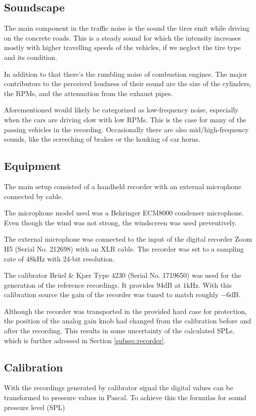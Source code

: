 \documentclass[twocolumn]{article}
\begin{document}
\subsection{Soundscape}
The main component in the traffic noise is the sound the tires emit while driving on the concrete roads.
This is a steady sound for which the intensity increases mostly with higher travelling speeds of the vehicles,
if we neglect the tire type and its condition.

In addition to that there's the rumbling noise of combustion engines.
The major contributors to the perceived loudness of their sound are the size of the cylinders, the RPMs, and
the attenuation from the exhaust pipes.

Aforementioned would likely be categorized as low-frequency noise, especially when the cars are driving slow
with low RPMs.
This is the case for many of the passing vehicles in the recording.
Occasionally there are also mid/high-frequency sounds, like the screeching of brakes or the honking of car horns.

\subsection{Equipment}
The main setup consisted of a handheld recorder with an external microphone connected by cable.

The microphone model used was a Behringer ECM8000 condenser microphone.
Even though the wind was not strong, the windscreen was used preventively.

The external microphone was connected to the input of the digital recorder Zoom H5 (Serial No. 212698) with
an XLR cable.
The recorder was set to a sampling rate of $48\textrm{kHz}$ with 24-bit resolution.

The calibrator Brüel \& Kjær Type 4230 (Serial No. 1719650) was used for the generation of the
reference recordings.
It provides 94dB at $1\textrm{kHz}$.
With this calibration source the gain of the recorder was tuned to match roughly $-6\textrm{dB}$.

Although the recorder was transported in the provided hard case for protection, the position of the analog gain
knob had changed from the calibration before and after the recording.
This results in some uncertainty of the calculated SPLs, which is further adressed in Section
\ref{subsec:recorder}.

\subsection{Calibration}
With the recordings generated by calibrator signal the digital values can be transformed to pressure
values in Pascal.
To achieve this the formulas for sound pressure level (SPL)
\end{document}
